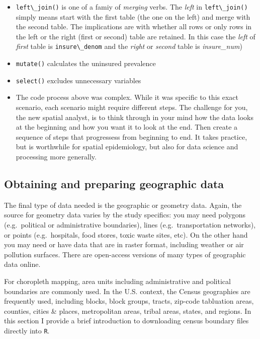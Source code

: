 \documentclass[
]{book}
\newcommand{\passthrough}[1]{#1}
\providecommand{\tightlist}{%
  \setlength{\itemsep}{0pt}\setlength{\parskip}{0pt}}
\newenvironment{rmdblock}[1]
  {%
  \begin{itemize}
  \renewcommand{\labelitemi}{
    \raisebox{-.7\height}[0pt][0pt]{
      {\setkeys{Gin}{width=3em,keepaspectratio}\texttt{[image: images/\#1]}}
    }
  }
  \item
  }
  {
  \end{itemize}
  }
\newenvironment{rmdnote}
  {\begin{rmdblock}{note}}
  {\end{rmdblock}}
\begin{document}
\begin{itemize}
\tightlist
\item
  \passthrough{\lstinline!left\_join()!} is one of a famiy of \emph{merging} verbs. The \emph{left} in \passthrough{\lstinline!left\_join()!} simply means start with the first table (the one on the left) and merge with the second table. The implications are with whether all rows or only rows in the left or the right (first or second) table are retained. In this case the \emph{left} of \emph{first} table is \passthrough{\lstinline!insure\_denom!} and the \emph{right} or \emph{second} table is \emph{insure\_num})
\item
  \passthrough{\lstinline!mutate()!} calculates the uninsured prevalence
\item
  \passthrough{\lstinline!select()!} excludes unnecessary variables
\end{itemize}

\begin{rmdnote}
The code process above was complex. While it was specific to this exact scenario, each scenario might require different steps. The challenge for you, the new spatial analyst, is to think through in your mind how the data looks at the beginning and how you want it to look at the end. Then create a sequence of steps that progressess from beginning to end. It takes practice, but is worthwhile for spatial epidemiology, but also for data science and processing more generally.
\end{rmdnote}

\hypertarget{obtaining-and-preparing-geographic-data}{%
\subsection{Obtaining and preparing geographic data}\label{obtaining-and-preparing-geographic-data}}

The final type of data needed is the geographic or geometry data. Again, the source for geometry data varies by the study specifics: you may need polygons (e.g.~political or administrative boundaries), lines (e.g.~transportation networks), or points (e.g.~hospitals, food stores, toxic waste sites, etc). On the other hand you may need or have data that are in raster format, including weather or air pollution surfaces. There are open-access versions of many types of geographic data online.

For choropleth mapping, area units including administrative and political boundaries are commonly used. In the U.S. context, the Census geographies are frequently used, including blocks, block groups, tracts, zip-code tabluation areas, counties, cities \& places, metropolitan areas, tribal areas, states, and regions. In this section I provide a brief introduction to downloading census boundary files directly into \passthrough{\lstinline!R!}.
\end{document}

